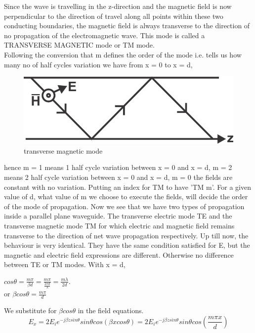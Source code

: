 Since the wave is travelling in the z-direction and the magnetic field is now perpendicular to the direction of travel along all points within these two conducting boundaries, the magnetic field is always transverse to the direction of no propagation of the electromagnetic wave. This mode is called a TRANSVERSE MAGNETIC mode or TM mode.\\ 
Following the conversion that m defines the order of the mode i.e. tells us how many no of half cycles variation we have from x = 0 to x = d,
\begin{figure}[h]
\centering
\includegraphics[scale=1]{./graphics/silas3}
\caption{transverse magnetic mode}
\end{figure}
 hence m = 1 means 1 half cycle variation between x = 0 and x = d, m = 2 means 2 half cycle variation between x = 0 and x = d, m = 0 the fields are constant with no variation. Putting an index for TM to have 'TM m'. For a given value of d, what value of m we choose to execute the fields, will decide the order of the mode of propagation. Now we see that we have two types of propagation inside a parallel plane waveguide. The transverse electric mode TE and the transverse magnetic mode TM for which electric and magnetic field remains transverse to the direction of net wave propagation respectively. Up till now, the behaviour is very identical. They have the same condition satisfied for E, but the magnetic and electric field expressions are different. Otherwise no difference between TE or TM modes. With x = d,
\begin{center}
$cos\theta = \frac{m \pi}{\beta d} =\frac{m \pi}{\frac{2\pi d}{\lambda}} = \frac{m\lambda}{2d}$.\\
or $\beta cos\theta = \frac{m \pi}{d}$
\end{center} 
We substitute for $\beta cos\theta$ in the field equations.\\
\begin{dmath}
E_{x} = 2 E_{i} e^{-j\beta zsin\theta} sin\theta cos(\beta xcos\theta) = 2 E_{i} e^{-j\beta zsin\theta} sin\theta cos(\frac{m\pi x}{d})
\end{dmath}
